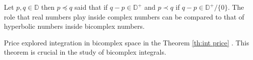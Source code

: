 \documentclass[a4paper,12pt]{article}
\newtheorem{theorem}{Theorem}[section]
\theoremstyle{remark}
\begin{document}
\noindent	 Let     $p,q\in\mathbb{D}$ then $p\preccurlyeq q$ said that  if $q-p\in\mathbb{D}^+$ and $p \prec q$ if $q-p\in\mathbb{D}^+/\{0\}.$  
\noindent	 The role that real numbers play inside complex numbers can be compared to that of hyperbolic numbers inside bicomplex numbers. %

 

Price explored integration in bicomplex space in the Theorem \ref{th:int price}  \cite{price1991}. This theorem is crucial in the study of bicomplex  integrals.
\end{document}
